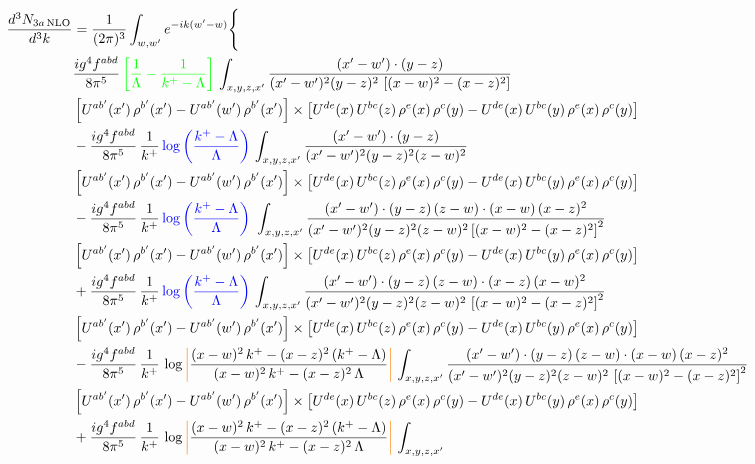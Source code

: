 \documentclass[9pt]{article}
\numberwithin{equation}{section}
\begin{document}
\begin{align}
\frac{d^{3}N_{3a\,\rm NLO}}{d^{3}k} & =\frac{1}{(2\pi)^{3}}\int_{w,w'}e^{-ik(w'-w)}\Bigg\{\notag \\ & \frac{ig^{4}f^{abd}}{8\pi^{5}}\,{\color{green}\left[\frac{1}{\Lambda}-\frac{1}{k^{+}-\Lambda}\right]}\,\int_{x,y,z,x'}
\frac{(x'-w')\cdot(y-z)}{(x'-w')^{2}(y-z)^{2}\,\left[(x-w)^{2}-(x-z)^{2}\right]}\notag \\ & \left[U^{ab'}(x')\,\rho^{b'}(x')-U^{ab'}(w')\, \rho^{b'}(x')\right]\times \left[U^{de}(x)\,U^{bc}(z)\, \rho^{e}(x)\,\rho^{c}(y)-U^{de}(x)\,U^{bc}(y)\,\rho^{e}(x)\,\rho^{c}(y)\right]\notag \\ & -\frac{ig^{4}f^{abd}}{8\pi^{5}}\,\frac{1}{k^{+}}\,{\color{blue}\log{\left(\frac{k^{+}-\Lambda}{\Lambda}\right)}}\,\int_{x,y,z,x'}
\frac{(x'-w')\cdot(y-z)}{(x'-w')^{2}(y-z)^{2}(z-w)^{2}}\notag \\ & \left[U^{ab'}(x')\,\rho^{b'}(x')-U^{ab'}(w')\, \rho^{b'}(x')\right]\times \left[U^{de}(x)\,U^{bc}(z)\, \rho^{e}(x)\,\rho^{c}(y)-U^{de}(x)\,U^{bc}(y)\,\rho^{e}(x)\,\rho^{c}(y)\right]\notag \\ & -\frac{ig^{4}f^{abd}}{8\pi^{5}}\,\frac{1}{k^{+}}\,{\color{blue}\log{\left(\frac{k^{+}-\Lambda}{\Lambda}\right)}}\,\,\int_{x,y,z,x'}
\frac{(x'-w')\cdot(y-z)\,(z-w)\cdot(x-w)\,(x-z)^{2}}{(x'-w')^{2}(y-z)^{2}(z-w)^{2}\left[(x-w)^{2}-(x-z)^{2}\right]^{2}}\notag \\ & \left[U^{ab'}(x')\,\rho^{b'}(x')-U^{ab'}(w')\, \rho^{b'}(x')\right]\times \left[U^{de}(x)\,U^{bc}(z)\, \rho^{e}(x)\,\rho^{c}(y)-U^{de}(x)\,U^{bc}(y)\,\rho^{e}(x)\,\rho^{c}(y)\right]\notag \\ & +\frac{ig^{4}f^{abd}}{8\pi^{5}}\,\frac{1}{k^{+}}\,{\color{blue}\log{\left(\frac{k^{+}-\Lambda}{\Lambda}\right)}}\,\int_{x,y,z,x'}
\frac{(x'-w')\cdot(y-z)\,(z-w)\cdot(x-z)\,(x-w)^{2}}{(x'-w')^{2}(y-z)^{2}(z-w)^{2}\,\left[(x-w)^{2}-(x-z)^{2}\right]^{2}}\notag \\ & \left[U^{ab'}(x')\,\rho^{b'}(x')-U^{ab'}(w')\, \rho^{b'}(x')\right]\times \left[U^{de}(x)\,U^{bc}(z)\, \rho^{e}(x)\,\rho^{c}(y)-U^{de}(x)\,U^{bc}(y)\,\rho^{e}(x)\,\rho^{c}(y)\right]\notag \\ & 
-\frac{ig^{4}f^{abd}}{8\pi^{5}}\,\frac{1}{k^{+}}\,\log{\textcolor{orange}{\left|\textcolor{black}{\frac{(x-w)^{2}\,k^{+}-(x-z)^{2}\,(k^{+}-\Lambda)}{(x-w)^{2}\,k^{+}-(x-z)^{2}\,\Lambda}}\right|}}\,\int_{x,y,z,x'}
\frac{(x'-w')\cdot(y-z)\,(z-w)\cdot(x-w)\,(x-z)^{2}}{(x'-w')^{2}(y-z)^{2}(z-w)^{2}\,\left[(x-w)^{2}-(x-z)^{2}\right]^{2}}\notag \\ & \left[U^{ab'}(x')\,\rho^{b'}(x')-U^{ab'}(w')\, \rho^{b'}(x')\right]\times \left[U^{de}(x)\,U^{bc}(z)\, \rho^{e}(x)\,\rho^{c}(y)-U^{de}(x)\,U^{bc}(y)\,\rho^{e}(x)\,\rho^{c}(y)\right]\notag \\ & +\frac{ig^{4}f^{abd}}{8\pi^{5}}\,\frac{1}{k^{+}}\,\log{\textcolor{orange}{\left|\textcolor{black}{\frac{(x-w)^{2}\,k^{+}-(x-z)^{2}\,(k^{+}-\Lambda)}{(x-w)^{2}\,k^{+}-(x-z)^{2}\,\Lambda}}\right|}}\,\int_{x,y,z,x'}

\end{align}
\end{document}
